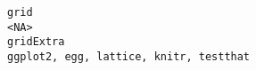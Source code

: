 \documentclass[
  letterpaper,
  DIV=11,
  numbers=noendperiod]{scrreprt}
\begin{document}
\begin{verbatim}
grid                                                                                                                                                                                                                                                                                                                                                                                                                                                                                                                                                                                                                                                                                                                                                                                                                                                                                                                                                                                                                                                                                                                                                                                                                                                                                                     <NA>
gridExtra                                                                                                                                                                                                                                                                                                                                                                                                                                                                                                                                                                                                                                                                                                                                                                                                                                                                                                                                                                                                                                                                                                                                                                                                                                                              ggplot2, egg, lattice, knitr, testthat

\end{verbatim}
\end{document}
